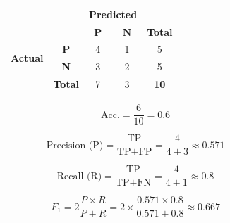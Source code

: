 \documentclass[aspectratio=169, 10pt]{beamer}
\begin{document}
\begin{frame}
\begin{columns}
\begin{column}{0.5\textwidth}
        \end{column}
        \begin{column}{0.5\textwidth}
            \begin{table}[]
                \begin{tabular}{ccccc}
                \textbf{}                        & \textbf{}                       & \multicolumn{2}{c}{\textbf{Predicted}}          &                \\
                                                 &                                 & \textbf{P}             & \textbf{N}             & \textbf{Total} \\ \cline{3-4}
                \multirow{2}{*}{\textbf{Actual}} & \multicolumn{1}{c|}{\textbf{P}} & \multicolumn{1}{c|}{4} & \multicolumn{1}{c|}{1} & 5              \\ \cline{3-4}
                                                 & \multicolumn{1}{c|}{\textbf{N}} & \multicolumn{1}{c|}{3} & \multicolumn{1}{c|}{2} & 5              \\ \cline{3-4}
                                                 & \textbf{Total}                  & 7                      & 3                      & \textbf{10}   
                \end{tabular}
            \end{table}
            
            \[
                \text{Acc.} = \frac{6}{10} = 0.6
            \]

            \[
                \text{Precision (P)} = \frac{\text{TP}}{\text{TP}+ \text{FP}} = \frac{4}{4+3} \approx 0.571
            \]

            \[
                \text{Recall (R)} = \frac{\text{TP}}{\text{TP}+ \text{FN}} = \frac{4}{4+1} \approx 0.8
            \]

            \[
                F_1 = 2 \frac{P \times R}{P + R} = 2 \times \frac{0.571 \times 0.8}{0.571 + 0.8} \approx 0.667
            \]

        \end{column}
    \end{columns}

\end{frame}
\end{document}
